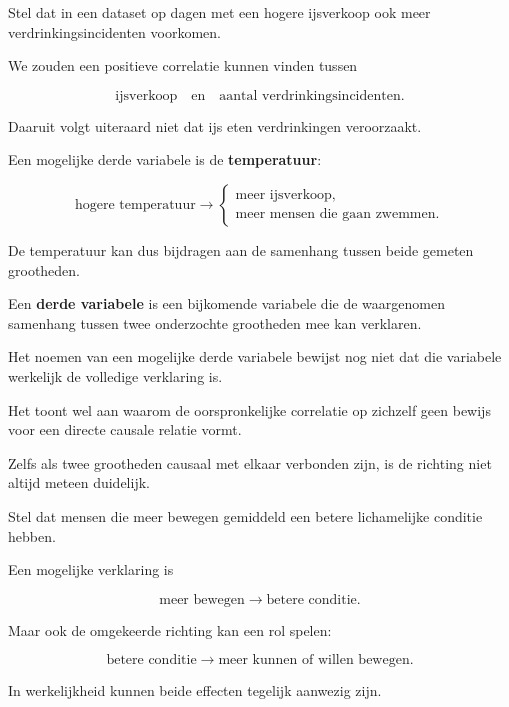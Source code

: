 \documentclass{ximera}
\begin{document}
\begin{voorbeeld}
Stel dat in een dataset op dagen met een hogere ijsverkoop ook meer
verdrinkingsincidenten voorkomen.

We zouden een positieve correlatie kunnen vinden tussen

\[
\text{ijsverkoop}
\quad\text{en}\quad
\text{aantal verdrinkingsincidenten}.
\]

Daaruit volgt uiteraard niet dat ijs eten verdrinkingen veroorzaakt.

Een mogelijke derde variabele is de \textbf{temperatuur}:

\[
\text{hogere temperatuur}
\longrightarrow
\begin{cases}
\text{meer ijsverkoop},\\
\text{meer mensen die gaan zwemmen}.
\end{cases}
\]

De temperatuur kan dus bijdragen aan de samenhang tussen beide
gemeten grootheden.
\end{voorbeeld}

\begin{definitie}
Een \textbf{derde variabele} is een bijkomende variabele die de
waargenomen samenhang tussen twee onderzochte grootheden mee kan
verklaren.
\end{definitie}

\begin{opmerking}
Het noemen van een mogelijke derde variabele bewijst nog niet dat die
variabele werkelijk de volledige verklaring is.

Het toont wel aan waarom de oorspronkelijke correlatie op zichzelf
geen bewijs voor een directe causale relatie vormt.
\end{opmerking}



Zelfs als twee grootheden causaal met elkaar verbonden zijn, is de
richting niet altijd meteen duidelijk.

\begin{voorbeeld}
Stel dat mensen die meer bewegen gemiddeld een betere lichamelijke
conditie hebben.

Een mogelijke verklaring is

\[
\text{meer bewegen}
\longrightarrow
\text{betere conditie}.
\]

Maar ook de omgekeerde richting kan een rol spelen:

\[
\text{betere conditie}
\longrightarrow
\text{meer kunnen of willen bewegen}.
\]

In werkelijkheid kunnen beide effecten tegelijk aanwezig zijn.
\end{voorbeeld}
\end{document}
